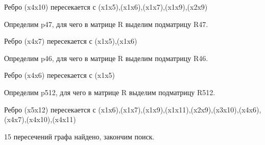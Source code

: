 \documentclass{article}
\begin{document}
Ребро (x4x10) пересекается с (x1x5),(x1x6),(x1x7),(x1x9),(x2x9)



Определим p47, для чего в матрице R выделим подматрицу R47.



Ребро (x4x7) пересекается с (x1x5),(x1x6)



Определим p46, для чего в матрице R выделим подматрицу R46.



Ребро (x4x6) пересекается с (x1x5)



Определим p512, для чего в матрице R выделим подматрицу R512.



Ребро (x5x12) пересекается с (x1x6),(x1x7),(x1x9),(x1x11),(x2x9),(x3x10),(x4x6),(x4x7),(x4x10),(x4x11)



15 пересечений графа найдено, закончим поиск.
\end{document}
